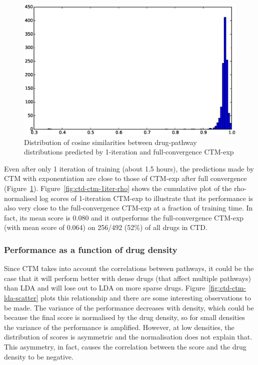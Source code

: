\documentclass[12pt,a4paper,twoside,openright]{report}
\begin{document}
\begin{figure}[!htb]
\includegraphics[width=\textwidth]{ctd-ctm-1iter-hist.eps}
\caption{Distribution of cosine similarities between drug-pathway distributions predicted by 1-iteration and full-convergence CTM-exp}
\label{fig:ctd-ctm-1iter-hist}
\end{figure}

Even after only 1 iteration of training (about 1.5 hours), the predictions made by CTM with exponentiation are close to those of CTM-exp after full convergence (Figure~\ref{fig:ctd-ctm-1iter-hist}). Figure~\ref{fig:ctd-ctm-1iter-rho} shows the cumulative plot of the rho-normalised log scores of 1-iteration CTM-exp to illustrate that its performance is also very close to the full-convergence CTM-exp at a fraction of training time. In fact, its mean score is 0.080 and it outperforms the full-convergence CTM-exp (with mean score of 0.064) on 256/492 (52\%) of all drugs in CTD.

\subsubsection{Performance as a function of drug density}

Since CTM takes into account the correlations between pathways, it could be the case that it will perform better with dense drugs (that affect multiple pathways) than LDA and will lose out to LDA on more sparse drugs. Figure~\ref{fig:ctd-ctm-lda-scatter} plots this relationship and there are some interesting observations to be made. The variance of the performance decreases with density, which could be because the final score is normalised by the drug density, so for small densities the variance of the performance is amplified. However, at low densities, the distribution of scores is asymmetric and the normalisation does not explain that. This asymmetry, in fact, causes the correlation between the score and the drug density to be negative.
\end{document}
